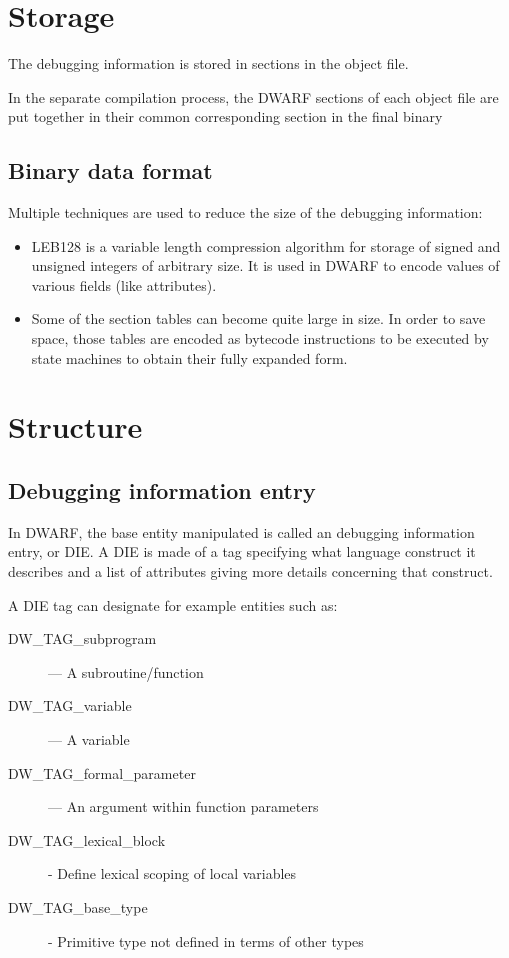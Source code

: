 \section{Storage}

The debugging information is stored in sections in the object file.

In the separate compilation process, the DWARF sections of each object file are
put together in their common corresponding section in the final binary

\subsection{Binary data format}

Multiple techniques are used to reduce the size of the debugging information:

\begin{itemize}
    \item LEB128 is a variable length compression algorithm for storage of
        signed and unsigned integers of arbitrary size.
        It is used in DWARF to encode values of various fields (like attributes).
    \item Some of the section tables can become quite large in size.
        In order to save space, those tables are encoded as bytecode instructions
        to be executed by state machines to obtain their fully expanded form.
\end{itemize}

\section{Structure}

\subsection{Debugging information entry}

In DWARF, the base entity manipulated is called an debugging information entry, or DIE.
A DIE is made of a tag specifying what language construct it describes and a list of attributes giving more details concerning that construct.

A DIE tag can designate for example entities such as:
\begin{description}
    \item[DW\_TAG\_subprogram] — A subroutine/function
    \item[DW\_TAG\_variable] — A variable
    \item[DW\_TAG\_formal\_parameter] — An argument within function parameters
    \item[DW\_TAG\_lexical\_block] - Define lexical scoping of local variables
    \item[DW\_TAG\_base\_type] - Primitive type not defined in terms of other
        types
\end{description}


